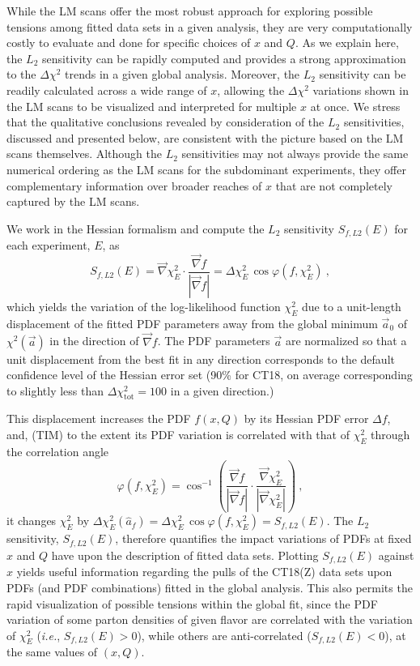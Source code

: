 %
%
While the LM scans offer the most robust approach for exploring
possible tensions among fitted data sets in a given analysis, they are
very computationally costly to evaluate and 
done for specific choices of $x$ and $Q$.
As we explain here, the $L_2$ sensitivity can be rapidly
computed and provides a strong approximation to the $\Delta \chi^2$
trends in
a given global analysis. Moreover, the $L_2$ sensitivity can be
readily calculated across a wide range of $x$, allowing the $\Delta \chi^2$
variations shown in the LM scans to be visualized and interpreted
for multiple $x$ at once. We stress that the qualitative conclusions
revealed by consideration of the $L_2$ sensitivities, discussed and
presented below, are consistent with the picture based on the LM
scans themselves.
Although the $L_2$ sensitivities may not always provide the same
numerical ordering as the LM scans for the subdominant experiments,
they offer complementary information over broader reaches of $x$
that are not completely captured by the LM scans.


We work in the Hessian formalism \cite{Pumplin:2002vw,Nadolsky:2008zw,Pumplin:2001ct} and compute the $L_2$ sensitivity $S_{f, L2}(E)$ for each experiment, $E$, as
%
%
\begin{equation}
S_{f, L2}(E) = \vec{\nabla} \chi^2_E \cdot \frac{ \vec{\nabla} f } { |\vec{\nabla} f| }
             = \Delta \chi^2_E\, \cos \varphi (f, \chi^2_E)\ ,
\label{eq:L2}
\end{equation}
%
%
which yields the variation of the log-likelihood function $\chi^2_E$ due to a unit-length
displacement of the fitted PDF parameters away from the global minimum $\vec{a}_0$ of
$\chi^2(\vec{a})$  in the direction of $\vec{\nabla}f$. 
The PDF parameters $\vec a$ are normalized so that a unit displacement
from the best fit in any direction corresponds to the default
confidence level of the Hessian error set (90\% for CT18,
on average corresponding to slightly less than
$\Delta\chi^2_{\textrm{tot}}=100$ in a given direction.)

This displacement increases the
PDF $f(x,Q)$ by its Hessian PDF error $\Delta f$, and, {\color{red} (TIM) to the extent its
PDF variation is correlated with that of $\chi^2_E$ through the correlation angle}
%
\begin{equation}
	\varphi(f, \chi^2_E) = \cos^{-1} \left( \frac{\vec{\nabla} f}{|\vec{\nabla} f |} \cdot \frac{\vec{\nabla} \chi^2_E}{|\vec{\nabla} \chi^2_E |} \right)\ ,
\end{equation}
%
it changes $\chi^2_E$ by $\Delta \chi^2_E (\hat{a}_f) = \Delta \chi^2_E\, \cos \varphi (f, \chi^2_E) = S_{f, L2}(E)$.
%
%
The $L_2$ sensitivity, $S_{f, L2}(E)$, therefore quantifies the impact variations of PDFs
at fixed $x$ and $Q$ have upon the description of fitted data sets.  Plotting $S_{f, L2}(E)$
against $x$ yields useful information regarding the pulls of the CT18(Z) data sets 
upon PDFs (and PDF combinations) fitted in the global analysis. This also permits
the rapid visualization of possible tensions within the global fit, since
the PDF variation of some parton densities of given flavor are correlated with the
variation of $\chi^2_E$ ({\it i.e.}, $S_{f, L2}(E) > 0$), while others are
anti-correlated ($S_{f, L2}(E) < 0$), at the same values of $(x, Q)$.

